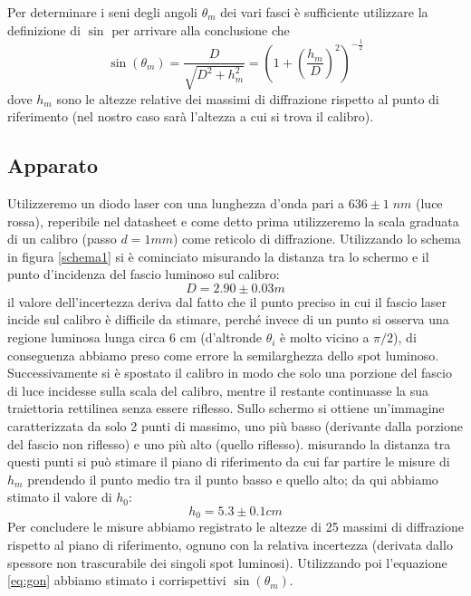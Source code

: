 \documentclass[10pt, a4paper, italian]{article}
\begin{document}
Per determinare i seni degli angoli $\theta _m$ dei vari fasci è sufficiente utilizzare la definizione di $\sin$ per arrivare alla conclusione che
\begin{equation}
\sin(\theta _m)=\frac{D}{\sqrt{D^2 + h_m^2}}=(1+ (\frac{h_m}{D})^2)^{-\frac{1}{2}}
\label{eq:gon}
\end{equation}
dove $h_m$ sono le altezze relative dei massimi di diffrazione rispetto al punto di riferimento (nel nostro caso sarà l'altezza a cui si trova il calibro).
\subsection{Apparato}
Utilizzeremo un diodo laser con una lunghezza d'onda pari a $636 \pm 1 \; nm$ (luce rossa), reperibile nel datasheet e come detto prima utilizzeremo la scala graduata di un calibro (passo $d= 1mm$) come reticolo di diffrazione.
Utilizzando lo schema in figura \ref{schema1} si è cominciato misurando la distanza tra lo schermo e il punto d'incidenza del fascio luminoso sul calibro:
\[
D=2.90 \pm 0.03 m
\]
il valore dell'incertezza deriva dal fatto che il punto preciso in cui il fascio laser incide sul calibro è difficile da stimare, perché invece di un punto si osserva una regione luminosa lunga circa 6 cm (d'altronde $\theta _i$ è molto vicino a $\pi /2$), di conseguenza abbiamo preso come errore la semilarghezza dello spot luminoso.
Successivamente si è spostato il calibro in modo che solo una porzione del fascio di luce incidesse sulla scala del calibro, mentre il restante continuasse la sua traiettoria rettilinea senza essere riflesso.
Sullo schermo si ottiene un'immagine caratterizzata da solo 2 punti di massimo, uno più basso (derivante dalla porzione del fascio non riflesso) e uno più alto (quello riflesso).
misurando la distanza tra questi punti si può stimare il piano di riferimento da cui far partire le misure di $h_m$ prendendo il punto medio tra il punto basso e quello alto; da qui abbiamo stimato il valore di $h_0$:
\[
h_0=5.3 \pm 0.1 cm
\]
Per concludere le misure abbiamo registrato le altezze di 25 massimi di diffrazione rispetto al piano di riferimento, ognuno con la relativa incertezza (derivata dallo spessore non trascurabile dei singoli spot luminosi).
Utilizzando poi l'equazione \ref{eq:gon} abbiamo stimato i corrispettivi $\sin(\theta _m)$.
\end{document}
